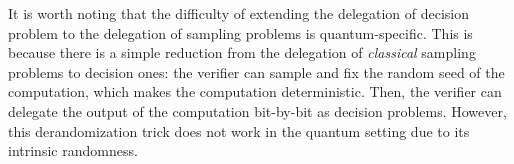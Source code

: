 





It is worth noting that the difficulty of extending the delegation of decision problem to the delegation of sampling problems is quantum-specific. This is because 
there is a simple reduction from the delegation of \emph{classical} sampling problems to decision ones:  the verifier can sample and fix the random seed of the computation, 
which makes the computation deterministic. Then, the verifier can delegate the output of the computation bit-by-bit as decision problems. However, this derandomization trick does not work in the quantum setting due to its intrinsic randomness.

